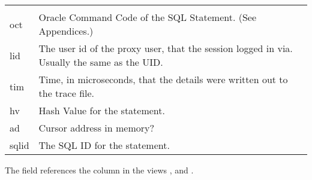 \begin{longtable}[]{@{}l|l@{}}
\begin{minipage}[t]{0.65\columnwidth}
\end{minipage}\tabularnewline
\begin{minipage}[t]{0.14\columnwidth}\raggedright\strut
oct\strut
\end{minipage} & \begin{minipage}[t]{0.65\columnwidth}\raggedright\strut
Oracle Command Code of the SQL Statement. (See Appendices.)\strut
\end{minipage}\tabularnewline
\begin{minipage}[t]{0.14\columnwidth}\raggedright\strut
lid\strut
\end{minipage} & \begin{minipage}[t]{0.65\columnwidth}\raggedright\strut
The user id of the proxy user, that the session logged in via. Usually the same as the UID.\strut
\end{minipage}\tabularnewline
\begin{minipage}[t]{0.14\columnwidth}\raggedright\strut
tim\strut
\end{minipage} & \begin{minipage}[t]{0.65\columnwidth}\raggedright\strut
Time, in microseconds, that the details were written out to the trace file.\strut
\end{minipage}\tabularnewline
\begin{minipage}[t]{0.14\columnwidth}\raggedright\strut
hv\strut
\end{minipage} & \begin{minipage}[t]{0.65\columnwidth}\raggedright\strut
Hash Value for the statement.\strut
\end{minipage}\tabularnewline
\begin{minipage}[t]{0.14\columnwidth}\raggedright\strut
ad\strut
\end{minipage} & \begin{minipage}[t]{0.65\columnwidth}\raggedright\strut
Cursor address in memory?\strut
\end{minipage}\tabularnewline
\begin{minipage}[t]{0.14\columnwidth}\raggedright\strut
sqlid\strut
\end{minipage} & \begin{minipage}[t]{0.65\columnwidth}\raggedright\strut
The SQL ID for the statement.\strut
\end{minipage}\tabularnewline
\bottomrule
\end{longtable}

The  field references the column  in the views ,  and .


